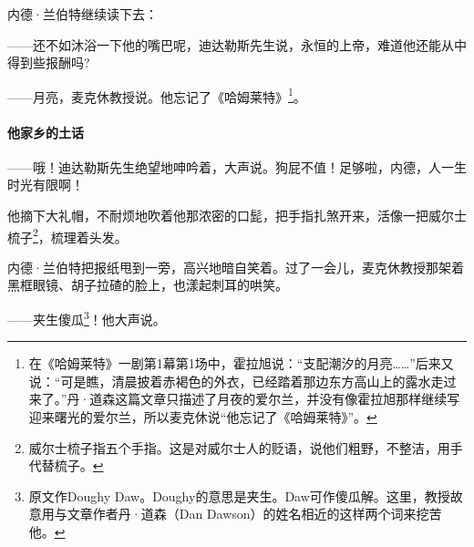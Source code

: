 \par 内德·兰伯特继续读下去：
\par ——还不如沐浴一下他的嘴巴呢，迪达勒斯先生说，永恒的上帝，难道他还能从中得到些报酬吗?
\par ——月亮，麦克休教授说。他忘记了《哈姆莱特》\footnote{在《哈姆莱特》一剧第1幕第1场中，霍拉旭说：“支配潮汐的月亮……”后来又说：“可是瞧，清晨披着赤褐色的外衣，已经踏着那边东方高山上的露水走过来了。”丹·道森这篇文章只描述了月夜的爱尔兰，并没有像霍拉旭那样继续写迎来曙光的爱尔兰，所以麦克休说“他忘记了《哈姆莱特》”。}。
\paragraph*{他家乡的土话}
\par ——哦！迪达勒斯先生绝望地呻吟着，大声说。狗屁不值！足够啦，内德，人一生时光有限啊！
\par 他摘下大礼帽，不耐烦地吹着他那浓密的口髭，把手指扎煞开来，活像一把威尔士梳子\footnote{威尔士梳子指五个手指。这是对威尔士人的贬语，说他们粗野，不整洁，用手代替梳子。}，梳理着头发。
\par 内德·兰伯特把报纸甩到一旁，高兴地暗自笑着。过了一会儿，麦克休教授那架着黑框眼镜、胡子拉碴的脸上，也漾起刺耳的哄笑。
\par ——夹生傻瓜\footnote{原文作Doughy Daw。Doughy的意思是夹生。Daw可作傻瓜解。这里，教授故意用与文章作者丹·道森（Dan Dawson）的姓名相近的这样两个词来挖苦他。}！他大声说。
